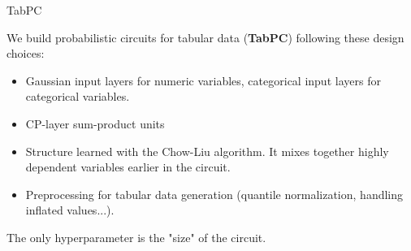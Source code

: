 

\begin{frame}[fragile]{TabPC}


    We build probabilistic circuits for tabular data (\textbf{TabPC}) following these design choices:
    \begin{itemize}
        \item Gaussian input layers for numeric variables, categorical input layers for categorical variables.
        \item CP-layer sum-product units
        \item Structure learned with the Chow-Liu algorithm. It mixes together highly dependent variables earlier in the circuit.
        \item Preprocessing for tabular data generation (quantile normalization, handling inflated values...).
    \end{itemize}

    The only hyperparameter is the "size" of the circuit.

\end{frame}

